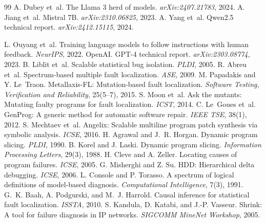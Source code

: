 \documentclass{article}
\begin{document}
\begin{thebibliography}{99}
 A. Dubey et~al. The Llama 3 herd of models. \emph{arXiv:2407.21783}, 2024.
 A. Jiang et~al. Mistral 7B. \emph{arXiv:2310.06825}, 2023.
 A. Yang et~al. Qwen2.5 technical report. \emph{arXiv:2412.15115}, 2024.

 L. Ouyang et~al. Training language models to follow instructions with human feedback. \emph{NeurIPS}, 2022.
 OpenAI. GPT-4 technical report. \emph{arXiv:2303.08774}, 2023. B. Liblit et~al. Scalable statistical bug isolation. \emph{PLDI}, 2005.
 R. Abreu et~al. Spectrum-based multiple fault localization. \emph{ASE}, 2009.
 M. Papadakis and Y. Le~Traon. Metallaxis-FL: Mutation-based fault localization. \emph{Software Testing, Verification and Reliability}, 25(5--7), 2015.
 S. Moon et~al. Ask the mutants: Mutating faulty programs for fault localization. \emph{ICST}, 2014.
 C. Le~Goues et~al. GenProg: A generic method for automatic software repair. \emph{IEEE TSE}, 38(1), 2012.
 S. Mechtaev et~al. Angelix: Scalable multiline program patch synthesis via symbolic analysis. \emph{ICSE}, 2016.
 H. Agrawal and J.~R. Horgan. Dynamic program slicing. \emph{PLDI}, 1990.
 B. Korel and J. Laski. Dynamic program slicing. \emph{Information Processing Letters}, 29(3), 1988.
 H. Cleve and A. Zeller. Locating causes of program failures. \emph{ICSE}, 2005.
 G. Misherghi and Z. Su. HDD: Hierarchical delta debugging. \emph{ICSE}, 2006.
 L. Console and P. Torasso. A spectrum of logical definitions of model-based diagnosis. \emph{Computational Intelligence}, 7(3), 1991.
 G.~K. Baah, A. Podgurski, and M.~J. Harrold. Causal inference for statistical fault localization. \emph{ISSTA}, 2010.
 S. Kandula, D. Katabi, and J.-P. Vasseur. Shrink: A tool for failure diagnosis in IP networks. \emph{SIGCOMM MineNet Workshop}, 2005.

\end{thebibliography}
\end{document}
